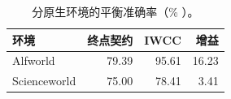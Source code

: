 \begin{table}[t]
\centering
\caption{分原生环境的平衡准确率（\% ）。}
\label{tab:environment-zh}
\begin{tabular}{lrrr}
\toprule
环境 & 终点契约 & IWCC & 增益 \\
\midrule
Alfworld & 79.39 & 95.61 & 16.23 \\
Scienceworld & 75.00 & 78.41 & 3.41 \\
\bottomrule
\end{tabular}
\end{table}
